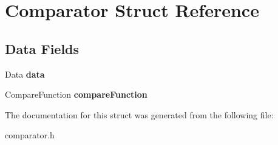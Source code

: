 \hypertarget{struct_comparator}{}\section{Comparator Struct Reference}
\label{struct_comparator}
\subsection*{Data Fields}
\begin{DoxyCompactItemize}
\item 
Data {\bfseries data}\hypertarget{struct_comparator_a6cd5475316bf41a2c56ffcc5de826b99}{}\label{struct_comparator_a6cd5475316bf41a2c56ffcc5de826b99}

\item 
Compare\+Function {\bfseries compare\+Function}\hypertarget{struct_comparator_a9996c06830d80ce991b124bdad03d3e2}{}\label{struct_comparator_a9996c06830d80ce991b124bdad03d3e2}

\end{DoxyCompactItemize}


The documentation for this struct was generated from the following file\+:\begin{DoxyCompactItemize}
\item 
comparator.\+h\end{DoxyCompactItemize}
